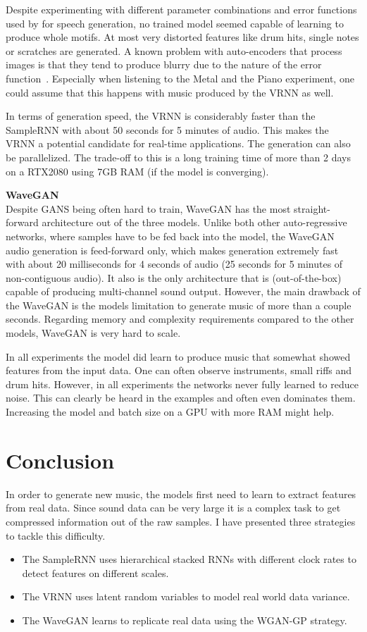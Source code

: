 \documentclass[12pt]{article}
\begin{document}
Despite experimenting with different parameter combinations and error functions used by \cite{chung2015recurrent} for speech generation, no trained model seemed capable of learning to produce whole motifs. 
At most very distorted features like drum hits, single notes or scratches are generated.
A known problem with auto-encoders that process images is that they tend to produce blurry due to the nature of the error function~\cite{larsen2015autoencoding}.
Especially when listening to the Metal and the Piano experiment, one could assume that this happens with music produced by the VRNN as well.

In terms of generation speed, the VRNN is considerably faster than the SampleRNN with about 50 seconds for 5 minutes of audio.
This makes the VRNN a potential candidate for real-time applications.
The generation can also be parallelized.
The trade-off to this is a long training time of more than 2 days on a RTX2080 using 7GB RAM (if the model is converging).


\textbf{WaveGAN}\\
Despite GANS being often hard to train, WaveGAN has the most straight-forward architecture out of the three models.
Unlike both other auto-regressive networks, where samples have to be fed back into the model, the WaveGAN audio generation is feed-forward only, which makes generation extremely fast with about 20 milliseconds for 4 seconds of audio (25 seconds for 5 minutes of non-contiguous audio).
It also is the only architecture that is (out-of-the-box) capable of producing multi-channel sound output.
However, the main drawback of the WaveGAN is the models limitation to generate music of more than a couple seconds.
Regarding memory and complexity requirements compared to the other models, WaveGAN is very hard to scale.

In all experiments the model did learn to produce music that somewhat showed features from the input data.
One can often observe instruments, small riffs and drum hits.
However, in all experiments the networks never fully learned to reduce noise.
This can clearly be heard in the examples and often even dominates them.
Increasing the model and batch size on a GPU with more RAM might help.



\section{Conclusion}
In order to generate new music, the models first need to learn to extract features from real data.
Since sound data can be very large it is a complex task to get compressed information out of the raw samples.
I have presented three strategies to tackle this difficulty.
\begin{itemize}
 \item The SampleRNN uses hierarchical stacked RNNs with different clock rates to detect features on different scales.
 \item The VRNN uses latent random variables to model real world data variance.
 \item The WaveGAN learns to replicate real data using the WGAN-GP strategy.
\end{itemize}
\end{document}
